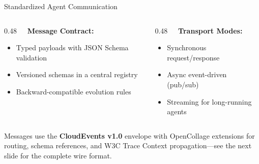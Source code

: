 \begin{frame}{Standardized Agent Communication}
  \vspace{-0.2cm}

  \fontsize{6}{7}\selectfont
  \begin{columns}[T]
    \begin{column}{0.48\textwidth}
      \textbf{\ \ Message Contract:}
      \begin{itemize}
        \item Typed payloads with JSON Schema validation
        \item Versioned schemas in a central registry
        \item Backward-compatible evolution rules
      \end{itemize}
    \end{column}
    \begin{column}{0.48\textwidth}
      \textbf{\ \ Transport Modes:}
      \begin{itemize}
        \item Synchronous request/response
        \item Async event-driven (pub/sub)
        \item Streaming for long-running agents
      \end{itemize}
    \end{column}
  \end{columns}

  \vspace{-0.1cm}

  \begin{exampleblock}{}
    \fontsize{6}{7}\selectfont
    Messages use the \textbf{CloudEvents v1.0} envelope with OpenCollage extensions for
    routing, schema references, and W3C Trace Context propagation---see the next slide
    for the complete wire format.
  \end{exampleblock}
\end{frame}

